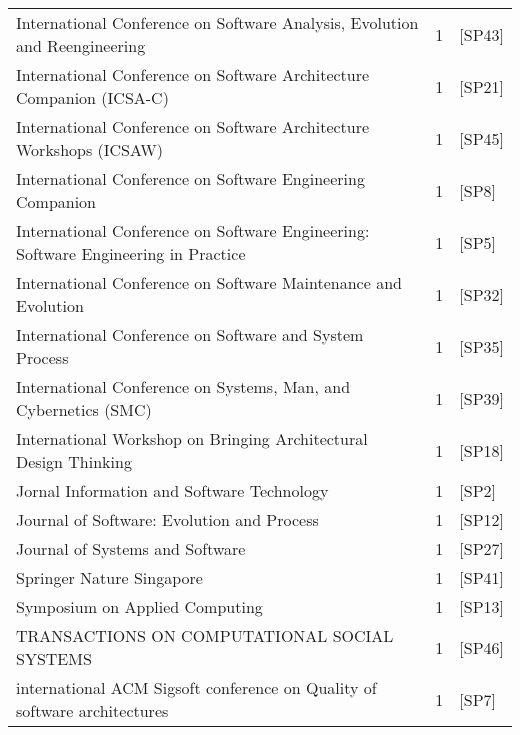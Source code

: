 \begin{tabular}{lrl}
           International Conference on Software Analysis, Evolution and Reengineering &      1 &                               [SP43] \\
                 International Conference on Software Architecture Companion (ICSA-C) &      1 &                               [SP21] \\
                  International Conference on Software Architecture Workshops (ICSAW) &      1 &                               [SP45] \\
                           International Conference on Software Engineering Companion &      1 &                                [SP8] \\
   International Conference on Software Engineering: Software Engineering in Practice &      1 &                                [SP5] \\
                       International Conference on Software Maintenance and Evolution &      1 &                               [SP32] \\
                              International Conference on Software and System Process &      1 &                               [SP35] \\
                      International Conference on Systems, Man, and Cybernetics (SMC) &      1 &                               [SP39] \\
                     International Workshop on Bringing Architectural Design Thinking &      1 &                               [SP18] \\
                                           Jornal Information and Software Technology &      1 &                                [SP2] \\
                                           Journal of Software: Evolution and Process &      1 &                               [SP12] \\
                                                      Journal of Systems and Software &      1 &                               [SP27] \\
                                                            Springer Nature Singapore &      1 &                               [SP41] \\
                                                       Symposium on Applied Computing &      1 &                               [SP13] \\
                                         TRANSACTIONS ON COMPUTATIONAL SOCIAL SYSTEMS &      1 &                               [SP46] \\
            international ACM Sigsoft conference on Quality of software architectures &      1 &                                [SP7] \\
\bottomrule
\end{tabular}
